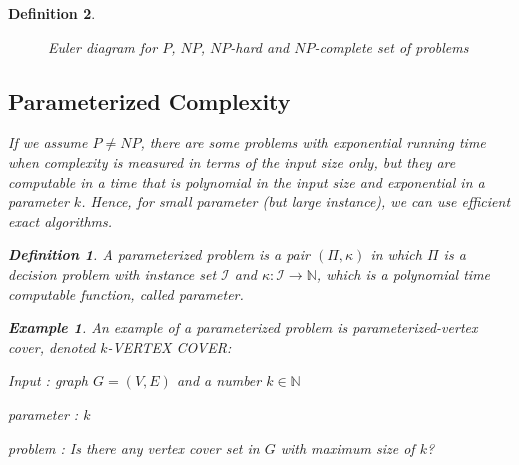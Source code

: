 \documentclass[12pt]{article}
\theoremstyle{slplain}
\newtheorem{defi}{Definition}
\newtheorem{exam}{Example}
\begin{document}
\begin{defi}
\begin{figure}[!ht]
\centering


\caption{\tiny Euler diagram for $P$, $NP$, $NP$-hard and $NP$-complete set of problems}\label{fig}
\end{figure}

\newpage
\subsection{Parameterized Complexity}

If we assume $P \not = NP$, there are some problems with exponential running time when complexity is measured in terms of the input size only, but they are computable in a time that is polynomial in the input size and exponential in a parameter $k$. Hence, for small parameter (but large instance), we can use efficient exact algorithms. 

\begin{defi}
A parameterized problem is a pair $(\Pi, \kappa)$ in which $\Pi$ is a
decision problem with instance set $\mathcal{I}$ and $\kappa : \mathcal{I} \to \mathbb{N}$, which is a polynomial
time computable function, called parameter.
\end{defi}

\begin{exam}
An example of a parameterized problem is parameterized-vertex cover, denoted $k$-VERTEX COVER:

Input : graph $G = (V, E)$ and a number $k \in \mathbb{N}$

parameter : $k$

problem : Is there any vertex cover set in $G$ with maximum size of $k$?
\end{exam}




\end{defi}
\end{document}
